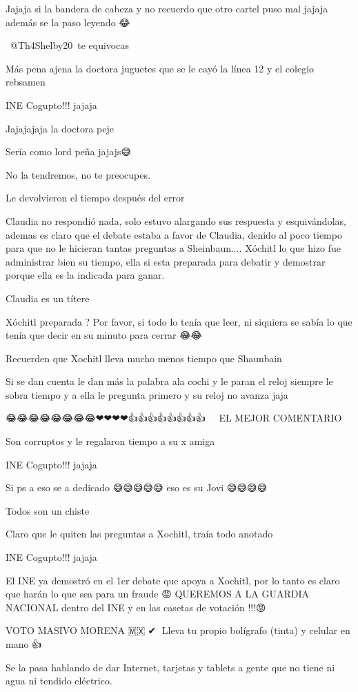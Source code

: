 Jajaja si la bandera de cabeza y no recuerdo que otro cartel puso mal jajaja además se la paso leyendo 😂

​ @Th4Shelby20 te equivocas

Más pena ajena la doctora juguetes que se le cayó la línea 12 y el colegio rebsamen

INE Cogupto!!! jajaja

Jajajajaja la doctora peje

Sería como lord peña jajajs😅

No la tendremos, no te preocupes.

Le devolvieron el tiempo después del error

Claudia no respondió nada, solo estuvo alargando sus respuesta y esquivándolas, ademas es claro que el debate estaba a favor de Claudia, denido al poco tiempo para que no le hicieran tantas preguntas a Sheinbaun.... Xóchitl lo que hizo fue administrar bien su tiempo, ella si esta preparada para debatir y demostrar porque ella es la indicada para ganar.

Claudia es un títere

Xóchitl preparada ? Por favor, si todo lo tenía que leer, ni siquiera se sabía lo que tenía que decir en su minuto para cerrar 😂😂

Recuerden que Xochitl lleva mucho menos tiempo que Shaunbain

Si se dan cuenta le dan más la palabra ala cochi y le paran el reloj siempre le sobra tiempo y a ella le pregunta primero y su reloj no avanza jaja

😂😂😂😂😂😂😂😂❤❤❤❤👍👍👍👍👍👍👍👍🤣🤣🤣🤣🤣EL MEJOR COMENTARIO

Son corruptos y le regalaron tiempo a su x amiga

INE Cogupto!!! jajaja

Si ps a eso se a dedicado 😅😅😅😅😅 eso es su Jovi 😅😅😅😅

Todos son un chiste

Claro que le quiten las preguntas a Xochitl, traía todo anotado

INE Cogupto!!! jajaja

El INE ya demostró en el 1er debate que apoya  a Xochitl, por lo tanto es claro que harán lo que sea para un fraude 😡 
QUEREMOS A LA GUARDIA NACIONAL dentro del INE y en las casetas de votación !!!😡👊 

VOTO MASIVO MORENA 🇲🇽💯✔💖
Lleva tu propio bolígrafo (tinta) y celular 
en mano 👍

Se la pasa hablando de dar Internet, tarjetas y tablets a gente que no tiene ni agua ni tendido eléctrico.

